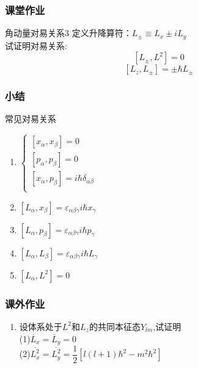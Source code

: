 \begin{frame} 
    \frametitle{课堂作业}
    \begin{atcbox}{角动量对易关系3}
     定义升降算符：$L_\pm \equiv L_x \pm i L_y$ \\
     试证明对易关系:  $$[L_\pm,L^2]=0$$
     $$[L_z, L_\pm]= \pm \hbar L_\pm $$
    \end{atcbox}
\end{frame} 


\begin{frame} 
    \frametitle{小结}
    \begin{atcbox}{常见对易关系}
        \begin{enumerate}
            \item $\begin{cases}
                [x_\alpha,x_\beta]= 0  \\ 
                [p_\alpha,p_\beta]= 0  \\ 
                [x_\alpha,p_\beta]= i\hbar \delta_{\alpha\beta}  \\ 
                \end{cases}$
            \item $ [L_\alpha,x_\beta]= \varepsilon_{\alpha\beta\gamma} i\hbar x_\gamma $
            \item $ [L_\alpha,p_\beta]= \varepsilon_{\alpha\beta\gamma} i\hbar p_\gamma $
            \item $ [L_\alpha,L_\beta]= \varepsilon_{\alpha\beta\gamma} i\hbar L_\gamma $
            \item $ [L_\alpha,L^2]= 0 $
        \end{enumerate}
    \end{atcbox}
\end{frame} 

\begin{frame}
    \frametitle{课外作业}
    \begin{enumerate}
        \item 设体系处于$L^2$和$L_z$的共同本征态$Y_{lm}$,试证明\\
              (1)$\overline{L}_x=\overline{L}_y=0$ \\
              (2)$\overline{L_x^2}=\overline{L_y^2}=\dfrac{1}{2}[l(l+1)\hbar^2-m^2\hbar^2]$ \\
    \end{enumerate}
\end{frame}


